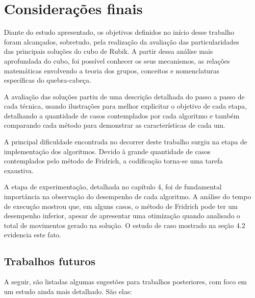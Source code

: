 \chapter{Considerações finais}

Diante do estudo apresentado, os objetivos definidos no início desse trabalho foram alcançados, sobretudo, pela realização da avaliação das particularidades das principais soluções do cubo de Rubik. A partir dessa análise mais aprofundada do cubo, foi possível conhecer os seus mecanismos, as relações matemáticas envolvendo a teoria dos grupos, conceitos e nomenclaturas específicas do quebra-cabeça.

A avaliação das soluções partiu de uma descrição detalhada do passo a passo de cada técnica, usando ilustrações para melhor explicitar o objetivo de cada etapa, detalhando a quantidade de casos contemplados por cada algoritmo e também comparando cada método para demonstrar as características de cada um.


A principal dificuldade encontrada no decorrer deste trabalho surgiu na etapa de implementação dos algoritmos. Devido à grande quantidade de casos contemplados pelo método de Fridrich, a codificação torna-se uma tarefa exaustiva.

A etapa de experimentação, detalhada no capítulo 4, foi de fundamental importância na observação do desempenho de cada algoritmo. A análise do tempo de execução mostrou que, em alguns casos, o método de Fridrich pode ter um desempenho inferior, apesar de apresentar uma otimização quando analisado o total de movimentos gerado na solução. O estudo de caso mostrado na seção 4.2 evidencia este fato.



\section{Trabalhos futuros}

A seguir, são listadas algumas sugestões para trabalhos posteriores, com foco em um estudo ainda mais detalhado. São elas:

